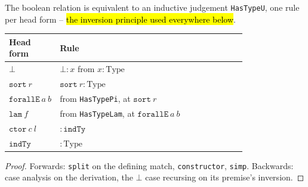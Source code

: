 \begin{theorem}
\label{thm:expa-hastype-unfold}
\leanok
{}
 The boolean relation is equivalent to an inductive judgement \texttt{HasTypeU}, one
rule per head form -- \hl{the inversion principle used everywhere below}.
\begin{center}
\begin{tabular}{lp{0.79\linewidth}}
\toprule
Head form & Rule \\
\midrule
$\bot$ & $\bot:x$ from $x:\mathrm{Type}$ \\
$\mathtt{sort}\ r$ & $\mathtt{sort}\ r:\mathrm{Type}$ \\
$\mathtt{forallE}\ a\ b$ & from \texttt{HasTypePi}, at $\mathtt{sort}\ r$ \\
$\mathtt{lam}\ f$ & from \texttt{HasTypeLam}, at $\mathtt{forallE}\ a\ b$ \\
$\mathtt{ctor}\ c\ l$ & $:\mathtt{indTy}$ \\
$\mathtt{indTy}$ & $:\mathrm{Type}$ \\
\bottomrule
\end{tabular}\par\smallskip
\end{center}
\end{theorem}
\begin{proof}
\leanok
{} Forwards: \texttt{split} on the defining match, \texttt{constructor}, \texttt{simp}. Backwards:
case analysis on the derivation, the $\bot$ case recursing on its premise's inversion.
\end{proof}

